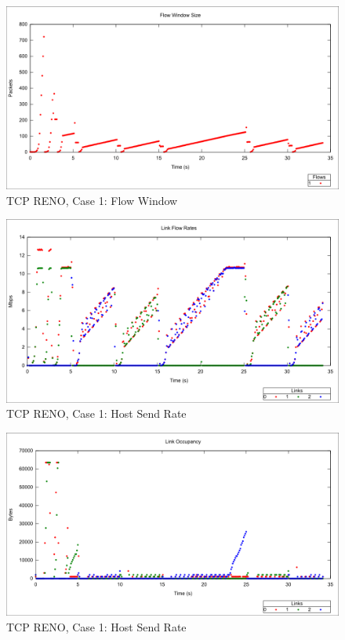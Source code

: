 \begin{figure}[htbp]
    \centering
    \includegraphics[width=\textwidth]{reno1/Flow_Window.png}
    \caption{TCP RENO, Case 1: Flow Window}
\end{figure}


\begin{figure}[htbp]
    \centering
    \includegraphics[width=\textwidth]{reno1/Link_Flow_Rate.png}
    \caption{TCP RENO, Case 1: Host Send Rate}
\end{figure}

\begin{figure}[htbp]
    \centering
    \includegraphics[width=\textwidth]{reno1/Link_Occupancy.png}
    \caption{TCP RENO, Case 1: Host Send Rate}
\end{figure}

